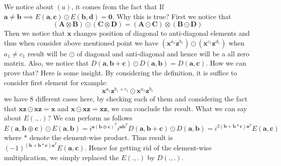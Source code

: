 \documentclass{article}
\begin{document}
\begin{enumerate}
	We notice about $(a)$, it comes from the fact that If $\mathbf{a} \neq \mathbf{b} \implies E(\mathbf{a}, \mathbf{c}) \odot E(\mathbf{b}, \mathbf{d}) = \mathbf{0}$. Why this is true? First we notice that 
	\begin{equation*}
		\left(\mathbf{A} \otimes \mathbf{B} \right) \odot \left(\mathbf{C} \otimes  \mathbf{D} \right) = \left(\mathbf{A} \odot \mathbf{C} \right) \otimes \left(\mathbf{B} \odot \mathbf{D}\right)
	\end{equation*}	
	Then we notice that $\mathbf{x}$ changes position of diagonal to anti-diagonal elements and thus when consider above mentioned point we have $\left(\mathbf{x}^{a_1} \mathbf{z}^{b_1}  \right) \odot \left(\mathbf{x}^{c_1} \mathbf{z}^{d_1}  \right)$ when $a_1 \neq c_1$ result will be $\odot$ of diagonal and anti-diagonal and hence will be a all zero matrix. Also, we notice that
	$D(\mathbf{a, b+c}) \odot D(\mathbf{a, b})=D(\mathbf{a, c})$. How we can prove that? Here is some insight. By considering the definition, it is suffice to consider first element for example:
	\begin{equation*}
		\mathbf{x}^{a_1}\mathbf{z}^{b_1+c_1} \odot \mathbf{x}^{a_1}\mathbf{z}^{b_1}
	\end{equation*}
	we have 8 different cases here, by checking each of them and considering the fact that $\mathbf{x}\mathbf{z}\odot \mathbf{x}\mathbf{z} = \mathbf{x}$ and $\mathbf{x}\odot \mathbf{x}\mathbf{z} = \mathbf{x}\mathbf{z}$, we can conclude the result. What we can say about $E(.,.)$? We can perform as follows
	\begin{equation*}
		E(\mathbf{a,b\oplus c}) \odot E(\mathbf{a,b}) = i^{\mathbf{a}(\mathbf{b\oplus c})^T}i^{\mathbf{a}\mathbf{b}^T}D(\mathbf{a,b+c}) \odot D(\mathbf{a,b}) = i^{2(\mathbf{b+b}*\mathbf{c})\mathbf{a}^T} E(\mathbf{a,c})
	\end{equation*}
	where $*$ denote the element-wise product. Thus result is  $(-1)^{(\mathbf{b+b}*\mathbf{c})\mathbf{a}^T}E(\mathbf{a,c})$. Hence for getting rid of the element-wise multiplication, we simply replaced the $E(.,.)$ by $D(.,.)$.
	
\end{enumerate}
\end{document}
